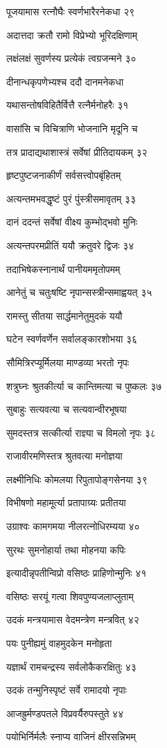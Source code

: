 पूजयामास रत्नौघैः स्वर्णभारैरनेकधा २९

अदात्तदा क्रतौ रामो विप्रेभ्यो भूरिदक्षिणाम्

लक्षंलक्षं सुवर्णस्य प्रत्येकं त्वग्रजन्मने ३०

दीनान्धकृपणेभ्यश्च ददौ दानमनेकधा

यथासन्तोषविहितैर्वित्तै रत्नैर्मनोहरैः ३१

वासांसि च विचित्राणि भोजनानि मृदूनि च

तत्र प्रादाद्यथाशास्त्रं सर्वेषां प्रीतिदायकम् ३२

हृष्टपुष्टजनाकीर्णं सर्वसत्त्वोपबृंहितम्

अत्यन्तमभवद्धृष्टं पुरं पुंस्त्रीसमावृतम् ३३

दानं ददन्तं सर्वेषां वीक्ष्य कुम्भोद्भवो मुनिः

अत्यन्तपरमप्रीतिं ययौ क्रतुवरे द्विजः ३४

तदाभिषेकस्नानार्थं पानीयममृतोपमम्

आनेतुं च चतुःषष्टि नृपान्सस्त्रीन्समाह्वयत् ३५

रामस्तु सीतया सार्द्धमानेतुमुदकं ययौ

घटेन स्वर्णवर्णेन सर्वालङ्कारशोभया ३६

सौमित्रिरप्यूर्मिलया माण्डव्या भरतो नृपः

शत्रुघ्नः श्रुतकीर्त्या च कान्तिमत्या च पुष्कलः ३७

सुबाहुः सत्यवत्या च सत्यवान्वीरभूषया

सुमदस्तत्र सत्कीर्त्या राज्ञ्या च विमलो नृपः ३८

राजावीरमणिस्तत्र श्रुतवत्या मनोज्ञया

लक्ष्मीनिधिः कोमलया रिपुतापोङ्गसेनया ३९

विभीषणो महामूर्त्या प्रतापाग्र्यः प्रतीतया

उग्राश्वः कामगमया नीलरत्नोधिरम्यया ४०

सुरथः सुमनोहार्या तथा मोहनया कपिः

इत्यादीन्नृपतीन्विप्रो वसिष्ठः प्राहिणोन्मुनिः ४१

वसिष्ठः सरयूं गत्वा शिवपुण्यजलाप्लुताम्

उदकं मन्त्रयामास वेदमन्त्रेण मन्त्रवित् ४२

पयः पुनीह्यमुं वाहमुदकेन मनोहृता

यज्ञार्थं रामचन्द्रस्य सर्वलोकैकरक्षितुः ४३

उदकं तन्मुनिस्पृष्टं सर्वे रामादयो नृपाः

आजह्रुर्मण्डपतले विप्रवर्यैरुपस्तुते ४४

पयोभिर्निर्मलैः स्नाप्य वाजिनं क्षीरसन्निभम्

